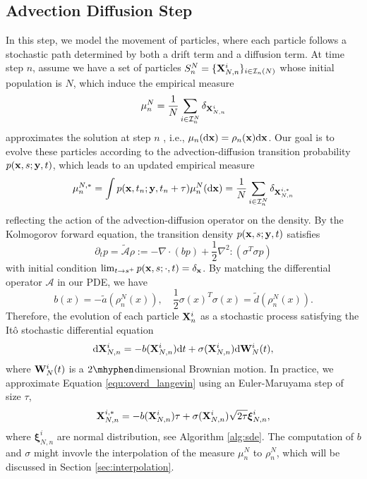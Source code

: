 \documentclass[12pt]{article}
\begin{document}
\subsection{Advection Diffusion Step}
In this step, we model the movement of particles, where each particle follows a stochastic path determined by both a drift term and a diffusion term. At time step $n$, assume we have a set of particles $S^N_n = \{\mathbf{X}^i_{N,n}\}_{i\in \mathcal I_n(N)}$ whose initial population is $N$, which induce the empirical measure 
\[
\mu^N_{n}= \frac{1}{N}\sum_{i\in \mathcal I_n^N}\delta_{\mathbf{X}_{N,n}^i}
\] 
approximates the solution at step $n$ , i.e.,  $\mu_n(\mathrm{d} \mathbf{x}) = \rho_n(\mathbf{x})\mathrm{d} \mathbf{x}$. 
Our goal is to evolve these particles according to the advection-diffusion transition probability $p(\mathbf{x},s;\mathbf{y},t)$, which leads to an updated empirical measure
\[\mu_n^{N,*} = \int p(\mathbf{x},t_n;\mathbf{y},t_n+\tau)  \mu_n^N(\mathrm{d} \mathbf{x}) =   \frac{1}{N}\sum_{i\in \mathcal I_n^N}\delta_{\mathbf{X}_{N,n}^{i,*}}
\]  
reflecting the action of the advection-diffusion operator on the density.
By the Kolmogorov forward equation, the transition density $p(\mathbf{x},s;\mathbf{y},t)$ satisfies 
\begin{equation}
    \partial_t p = \tilde {\mathcal A }\rho := - \nabla \cdot(b  p) + \frac{1}{2}\nabla^2:(\sigma^T\sigma p) 
\end{equation}
with initial condition $\lim_{t\to s^+} p(\mathbf{x},s;\cdot,t) = \delta_{\mathbf{x}}$. By matching the differential operator $\mathcal A$ in our PDE, we have 
\begin{equation}
    b(x) = -\tilde a(\rho^N_n(x)), \quad \frac{1}{2}\sigma(x)^T \sigma(x) = \tilde d(\rho^N_n(x)).
\end{equation}
Therefore, the evolution of each particle $\mathbf{X}^i_n$ as a stochastic process satisfying the It\^o stochastic differential equation
\begin{equation}\label{equ:overd_langevin}
    \mathrm{d} \mathbf{X}_{N,n}^i = - b(\mathbf{X}_{N,n}^i) \mathrm{d} t  + \sigma(\mathbf{X}_{N,n}^i) \mathrm{d} \mathbf{W}^i_{N}(t),
\end{equation}
where $\mathbf{W}^i_{N}(t)$ is a $2\mhyphen$dimensional Brownian motion. 
In practice, we approximate Equation \eqref{equ:overd_langevin} using an Euler-Maruyama step of size $\tau$, 
\[
 \mathbf{X}_{N,n}^{i,*} = - b(\mathbf{X}_{N,n}^i) \tau  + \sigma(\mathbf{X}_{N,n}^i) \sqrt{2\tau} \boldsymbol{\xi}^i_{N,n},
\]
where $\boldsymbol{\xi}^i_{N,n}$ are normal distribution, see Algorithm \ref{alg:sde}.
The computation of $b$ and $\sigma$ might invovle the interpolation of the measure $\mu_n^N$ to $\rho_n^N$, which will be discussed in Section \ref{sec:interpolation}.
\end{document}

